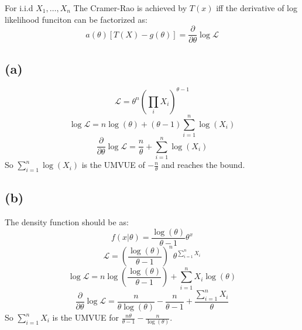 For i.i.d $X_1,\dots,X_n$ The Cramer-Rao is achieved by $T(x)$ iff the derivative of log likelihood funciton can be 
factorized as:
$$
a(\theta)[T(X) - g(\theta)] = \frac{\partial}{\partial\theta}\log\mathcal{L}
$$

\subsection{(a)}
$$
\mathcal{L} = \theta^n(\prod_iX_i)^{\theta - 1}
$$
$$
\log\mathcal{L} = n\log(\theta) + (\theta - 1)\sum_{i = 1}^n\log(X_i)
$$
$$
\frac{\partial}{\partial\theta}\log\mathcal{L} = \frac{n}{\theta} + \sum_{i = 1}^n\log(X_i)
$$
So $\sum_{i = 1}^n\log(X_i)$ is the UMVUE of $-\frac{n}{\theta}$ and reaches the bound.
\subsection{(b)}
The density function should be as:
$$
f(x|\theta) = \frac{\log(\theta)}{\theta - 1}\theta^x
$$
$$
\mathcal{L} = (\frac{\log(\theta)}{\theta - 1})^n\theta^{\sum_{i = 1}^nX_i}
$$
$$
\log\mathcal{L} = n\log(\frac{\log(\theta)}{\theta - 1}) + \sum_{i = 1}^nX_i\log(\theta)
$$
$$
\frac{\partial}{\partial\theta}\log\mathcal{L} = \frac{n}{\theta\log(\theta)} - \frac{n}{\theta - 1} + \frac{\sum_{i = 1}^nX_i}{\theta}
$$
So $\sum_{i = 1}^nX_i$ is the UMVUE for $\frac{n\theta}{\theta - 1} - \frac{n}{\log(\theta)}$.